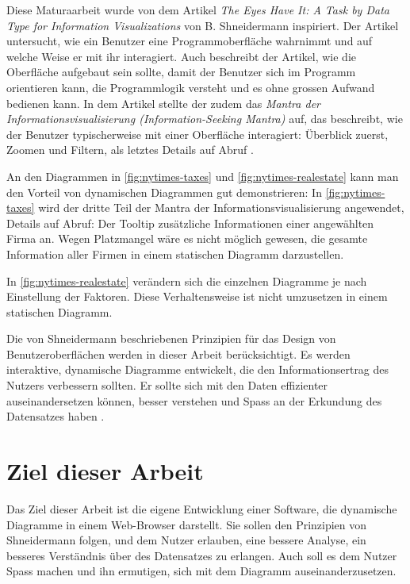 
Diese Maturaarbeit wurde von dem Artikel \textit{The Eyes Have It: A Task by Data Type for Information Visualizations} von B. Shneidermann \cite{shneiderman} inspiriert. Der Artikel untersucht, wie ein Benutzer eine Programmoberfläche wahrnimmt und auf welche Weise er mit ihr interagiert. Auch beschreibt der Artikel, wie die Oberfläche aufgebaut sein sollte, damit der Benutzer sich im Programm orientieren kann, die Programmlogik versteht und es ohne grossen Aufwand bedienen kann. In dem Artikel stellte der zudem das \textit{Mantra der Informationsvisualisierung (Information-Seeking Mantra)} auf, das beschreibt, wie der Benutzer typischerweise mit einer Oberfläche interagiert: Überblick zuerst, Zoomen und Filtern, als letztes Details auf Abruf \cite{shneiderman}.

An den Diagrammen in \ref{fig:nytimes-taxes} und \ref{fig:nytimes-realestate} kann man den Vorteil von dynamischen Diagrammen gut demonstrieren: In \ref{fig:nytimes-taxes} wird der dritte Teil der Mantra der Informationsvisualisierung angewendet, Details auf Abruf: Der Tooltip zusätzliche Informationen einer angewählten Firma an. Wegen Platzmangel wäre es nicht möglich gewesen, die gesamte Information aller Firmen in einem statischen Diagramm darzustellen.

In \ref{fig:nytimes-realestate} verändern sich die einzelnen Diagramme je nach Einstellung der Faktoren. Diese Verhaltensweise ist nicht umzusetzen in einem statischen Diagramm.

Die von Shneidermann beschriebenen Prinzipien für das Design von Benutzeroberflächen werden in dieser Arbeit berücksichtigt. Es werden interaktive, dynamische Diagramme entwickelt, die den Informationsertrag des Nutzers verbessern sollten. Er sollte sich mit den Daten effizienter auseinandersetzen können, besser verstehen und Spass an der Erkundung des Datensatzes haben \cite{shneiderman}.

\section{Ziel dieser Arbeit}

Das Ziel dieser Arbeit ist die eigene Entwicklung einer Software, die dynamische Diagramme in einem Web-Browser darstellt. Sie sollen den Prinzipien von Shneidermann folgen, und dem Nutzer erlauben, eine bessere Analyse, ein besseres Verständnis über des Datensatzes zu erlangen. Auch soll es dem Nutzer Spass machen und ihn ermutigen, sich mit dem Diagramm auseinanderzusetzen.

